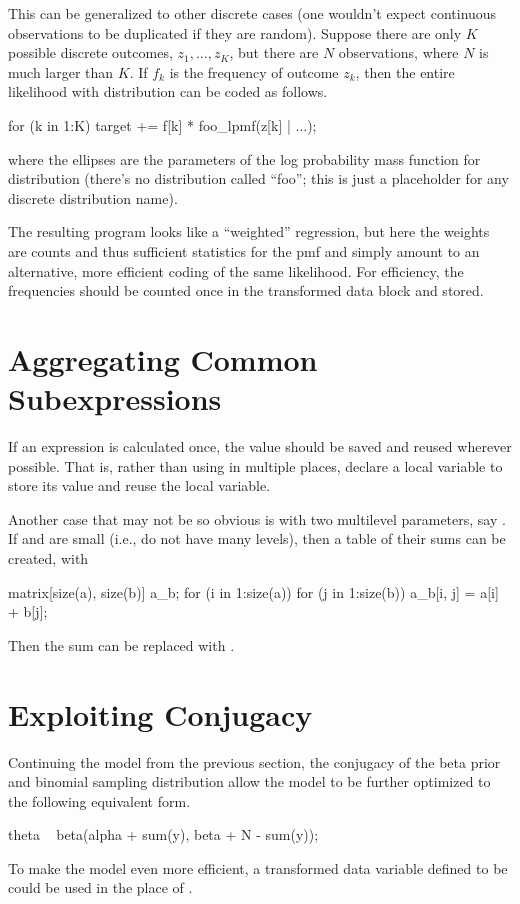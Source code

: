 This can be generalized to other discrete cases (one wouldn't expect
continuous observations to be duplicated if they are random).  Suppose
there are only $K$ possible discrete outcomes, $z_1, \ldots, z_K$, but
there are $N$ observations, where $N$ is much larger than $K$.  If
$f_k$ is the frequency of outcome $z_k$, then the entire likelihood
with distribution  can be coded as follows.
%
\begin{stancode}
for (k in 1:K)
  target += f[k] * foo_lpmf(z[k] | ...);
\end{stancode}
%
where the ellipses are the parameters of the log probability mass
function for distribution  (there's no distribution called
``foo''; this is just a placeholder for any discrete distribution
name).

The resulting program looks like a ``weighted'' regression, but here
the weights  are counts and thus sufficient statistics for
the pmf and simply amount to an alternative, more efficient coding of
the same likelihood.  For efficiency, the frequencies 
should be counted once in the transformed data block and stored.


\section{Aggregating Common Subexpressions}

If an expression is calculated once, the value should be saved and
reused wherever possible.  That is, rather than using
 in multiple places, declare a local variable to
store its value and reuse the local variable.

Another case that may not be so obvious is with two multilevel
parameters, say .  If  and 
are small (i.e., do not have many levels), then a table  of
their sums can be created, with
%
\begin{stancode}
matrix[size(a), size(b)] a_b;
for (i in 1:size(a))
  for (j in 1:size(b))
    a_b[i, j] = a[i] + b[j];
\end{stancode}
%
Then the sum can be replaced with .


\section{Exploiting Conjugacy}


Continuing the model from the previous section, the conjugacy of the
beta prior and binomial sampling distribution allow the model to be
further optimized to the following equivalent form.
%
\begin{stancode}
    theta ~ beta(alpha + sum(y), beta + N - sum(y));
\end{stancode}
%
To make the model even more efficient, a transformed data variable
defined to be  could be used in the place of .

